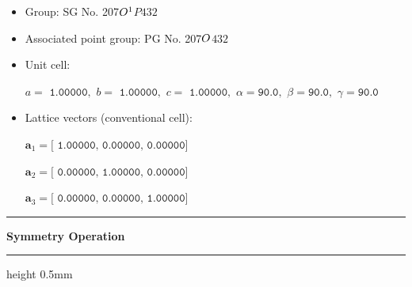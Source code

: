 \documentclass[fleqn,10pt,landscape]{jsarticle}
\begin{document}
\begin{itemize}
\item Group: SG No. 207\quad$O_{\rm }^{1}$\quad$P432$\quad[ cubic ]
\item Associated point group: PG No. 207\quad$O_{\rm }$\quad$432$\quad[ cubic ]
\end{itemize}
\begin{itemize}
\item Unit cell:

\quad $a=\texttt{ 1.00000},\,\, b=\texttt{ 1.00000},\,\, c=\texttt{ 1.00000},\,\, \alpha=\texttt{90.0},\,\, \beta=\texttt{90.0},\,\, \gamma=\texttt{90.0}$

\item Lattice vectors (conventional cell):

\quad $\bm{a}_1=\texttt{[ 1.00000, 0.00000, 0.00000]}$

\quad $\bm{a}_2=\texttt{[ 0.00000, 1.00000, 0.00000]}$

\quad $\bm{a}_3=\texttt{[ 0.00000, 0.00000, 1.00000]}$

\end{itemize}
\vspace{5mm}
\noindent \rule[0.5mm]{5mm}{0.5mm}\hspace{3mm}\textbf{Symmetry Operation}\hspace{3mm}\leaders\hrule height 0.5mm\hfill\kern0pt
\vspace{3mm}
\end{document}
